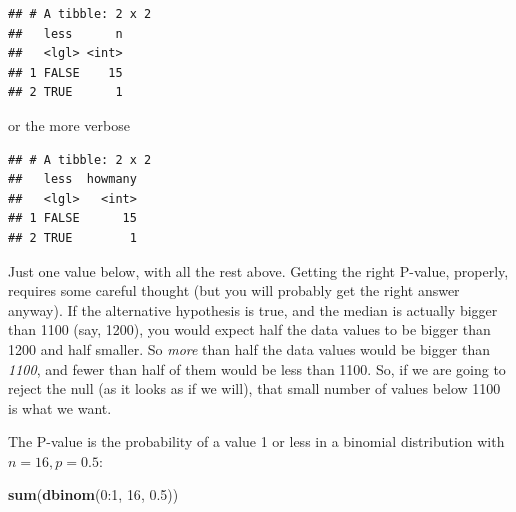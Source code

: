 \documentclass[]{tufte-book}
\newenvironment{Shaded}{}{}
\newcommand{\DataTypeTok}[1]{\textcolor[rgb]{0.56,0.13,0.00}{#1}}
\newcommand{\DecValTok}[1]{\textcolor[rgb]{0.25,0.63,0.44}{#1}}
\newcommand{\FloatTok}[1]{\textcolor[rgb]{0.25,0.63,0.44}{#1}}
\newcommand{\KeywordTok}[1]{\textcolor[rgb]{0.00,0.44,0.13}{\textbf{#1}}}
\newcommand{\NormalTok}[1]{#1}
\newcommand{\OperatorTok}[1]{\textcolor[rgb]{0.40,0.40,0.40}{#1}}
\newcommand{\StringTok}[1]{\textcolor[rgb]{0.25,0.44,0.63}{#1}}
\theoremstyle{definition}
\theoremstyle{definition}
\theoremstyle{definition}
\theoremstyle{remark}
\begin{document}
\begin{Shaded}
\end{Shaded}

\begin{verbatim}
## # A tibble: 2 x 2
##   less      n
##   <lgl> <int>
## 1 FALSE    15
## 2 TRUE      1
\end{verbatim}

or the more verbose

\begin{Shaded}
\end{Shaded}

\begin{verbatim}
## # A tibble: 2 x 2
##   less  howmany
##   <lgl>   <int>
## 1 FALSE      15
## 2 TRUE        1
\end{verbatim}

Just one value below, with all the rest above. Getting the right
P-value, properly, requires some careful thought (but you will probably
get the right answer anyway). If the alternative hypothesis is true, and
the median is actually bigger than 1100 (say, 1200), you would expect
half the data values to be bigger than 1200 and half smaller. So
\emph{more} than half the data values would be bigger than \emph{1100},
and fewer than half of them would be less than 1100. So, if we are going
to reject the null (as it looks as if we will), that small number of
values below 1100 is what we want.

The P-value is the probability of a value 1 or less in a binomial
distribution with \(n=16, p=0.5\):

\begin{Shaded}
\begin{Highlighting}[]
\KeywordTok{sum}\NormalTok{(}\KeywordTok{dbinom}\NormalTok{(}\DecValTok{0}\OperatorTok{:}\DecValTok{1}\NormalTok{, }\DecValTok{16}\NormalTok{, }\FloatTok{0.5}\NormalTok{))}
\end{Highlighting}
\end{Shaded}
\end{document}
